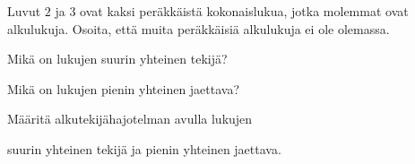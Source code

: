 \begin{tehtavasivu}
\begin{tehtava}
\end{tehtava}

\begin{tehtava}
    Luvut $2$ ja $3$ ovat kaksi peräkkäistä kokonaislukua, jotka molemmat ovat alkulukuja. Osoita, että muita peräkkäisiä alkulukuja ei ole olemassa.
\end{tehtava}

\begin{tehtava}
    Mikä on lukujen suurin yhteinen tekijä?
    
    \begin{alakohdat}
    \end{alakohdat}
    
    \begin{vastaus}
        \begin{alakohdat}
        \end{alakohdat}
    \end{vastaus}
    
\end{tehtava}

\begin{tehtava}
    Mikä on lukujen pienin yhteinen jaettava?
    
    \begin{alakohdat}
    \end{alakohdat}
    
    \begin{vastaus}
        \begin{alakohdat}
        \end{alakohdat}
    \end{vastaus}
    
\end{tehtava}

\begin{tehtava}
    Määritä alkutekijähajotelman avulla lukujen
    \begin{alakohdat}
    \end{alakohdat}
    suurin yhteinen tekijä ja pienin yhteinen jaettava.
    

\end{tehtava}
\end{tehtavasivu}
